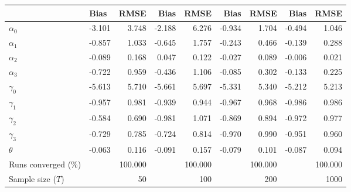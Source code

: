 
\begin{tabular}[t]{llrrrrrrr}
\toprule
  & Bias & RMSE & Bias & RMSE & Bias & RMSE & Bias & RMSE\\
\midrule
$\alpha_{0}$ & -3.101 & 3.748 & -2.188 & 6.276 & -0.934 & 1.704 & -0.494 & 1.046\\
$\alpha_{1}$ & -0.857 & 1.033 & -0.645 & 1.757 & -0.243 & 0.466 & -0.139 & 0.288\\
$\alpha_{2}$ & -0.089 & 0.168 & 0.047 & 0.122 & -0.027 & 0.089 & -0.006 & 0.021\\
$\alpha_{3}$ & -0.722 & 0.959 & -0.436 & 1.106 & -0.085 & 0.302 & -0.133 & 0.225\\
$\gamma_{0}$ & -5.613 & 5.710 & -5.661 & 5.697 & -5.331 & 5.340 & -5.212 & 5.213\\
$\gamma_{1}$ & -0.957 & 0.981 & -0.939 & 0.944 & -0.967 & 0.968 & -0.986 & 0.986\\
$\gamma_{2}$ & -0.584 & 0.690 & -0.981 & 1.071 & -0.869 & 0.894 & -0.972 & 0.977\\
$\gamma_{3}$ & -0.729 & 0.785 & -0.724 & 0.814 & -0.970 & 0.990 & -0.951 & 0.960\\
$\theta$ & -0.063 & 0.116 & -0.091 & 0.157 & -0.079 & 0.101 & -0.087 & 0.094\\
Runs converged (\%) &  & 100.000 &  & 100.000 &  & 100.000 &  & 100.000\\
Sample size ($T$) &  & 50 &  & 100 &  & 200 &  & 1000\\
\bottomrule
\end{tabular}
